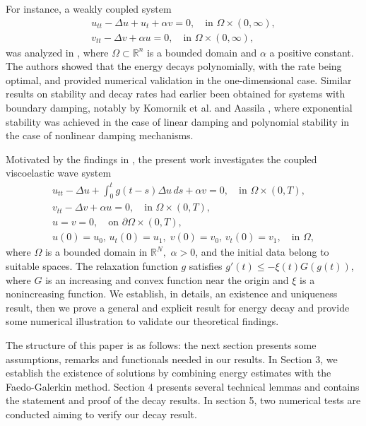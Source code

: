 \documentclass[11pt]{article}
\numberwithin{equation}{section}
\begin{document}
For instance, a weakly coupled system
\begin{gather*}
u_{tt} - \Delta u + u_t + \alpha v = 0, \quad \text{in } \Omega \times (0, \infty), \\
v_{tt} - \Delta v + \alpha u = 0, \quad \text{in } \Omega \times (0, \infty),
\end{gather*}
was analyzed in \cite{LRF}, where $\Omega \subset \mathbb{R}^n$ is a bounded domain and
$\alpha$ a positive constant. The authors showed that the energy decays polynomially,
with the rate being optimal, and provided numerical validation in the one-dimensional case.
Similar results on stability and decay rates had earlier been obtained for systems with
boundary damping, notably by Komornik et al. \cite{KVBR} and Aassila \cite{Assila1, Assila2},
where exponential stability was achieved in the case of linear damping and polynomial stability
in the case of nonlinear damping mechanisms.

Motivated by the findings in \cite{GASM}, the present work investigates the coupled viscoelastic wave system
\begin{equation} \label{e1.1}
\begin{gathered}
u_{tt} - \Delta u + \int_0^t g(t - s) \Delta u \, ds + \alpha v = 0, \quad
 \text{in } \Omega \times (0, T), \\
v_{tt} - \Delta v + \alpha u = 0, \quad \text{in } \Omega \times (0, T), \\
u = v = 0, \quad \text{on } \partial \Omega \times (0, T), \\
u(0) = u_0, \, u_t(0) = u_1, \; v(0) = v_0, \, v_t(0) = v_1, \quad \text{in } \Omega,
\end{gathered}
\end{equation}
where \( \Omega \) is a bounded domain in \( \mathbb{R}^N, \) \( \alpha > 0 \), and the initial
data belong to suitable spaces. The relaxation function \( g \) satisfies
\( g'(t) \leq -\xi(t) G(g(t)) \), where $G$ is an increasing and convex function near the origin and
$\xi$ is a nonincreasing function. We establish, in details, an existence and uniqueness result,
then we prove a general and explicit result for energy decay and provide some numerical
illustration to validate our theoretical findings.

The structure of this paper is as follows: the next section presents some assumptions,
remarks and functionals needed in our results. In Section 3, we establish the existence of
solutions by combining energy estimates with the Faedo-Galerkin method.
Section 4 presents several technical lemmas and contains the statement and proof of the
decay results.
In section 5, two numerical tests are conducted aiming to verify our decay result.
\end{document}
